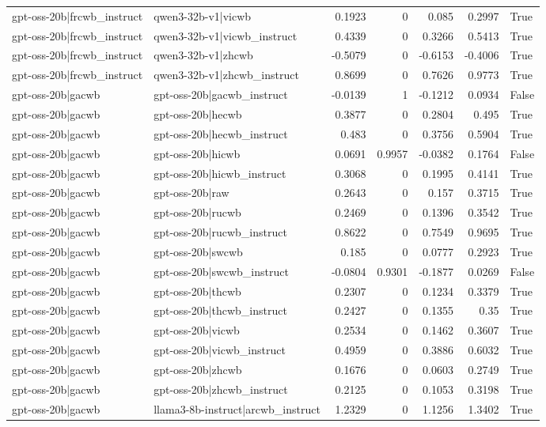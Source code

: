 \begin{table}
\begin{tabular}{l l r r r r l}
gpt-oss-20b|frcwb_instruct & qwen3-32b-v1|vicwb & 0.1923 & 0 & 0.085 & 0.2997 & True \\
gpt-oss-20b|frcwb_instruct & qwen3-32b-v1|vicwb_instruct & 0.4339 & 0 & 0.3266 & 0.5413 & True \\
gpt-oss-20b|frcwb_instruct & qwen3-32b-v1|zhcwb & -0.5079 & 0 & -0.6153 & -0.4006 & True \\
gpt-oss-20b|frcwb_instruct & qwen3-32b-v1|zhcwb_instruct & 0.8699 & 0 & 0.7626 & 0.9773 & True \\
gpt-oss-20b|gacwb & gpt-oss-20b|gacwb_instruct & -0.0139 & 1 & -0.1212 & 0.0934 & False \\
gpt-oss-20b|gacwb & gpt-oss-20b|hecwb & 0.3877 & 0 & 0.2804 & 0.495 & True \\
gpt-oss-20b|gacwb & gpt-oss-20b|hecwb_instruct & 0.483 & 0 & 0.3756 & 0.5904 & True \\
gpt-oss-20b|gacwb & gpt-oss-20b|hicwb & 0.0691 & 0.9957 & -0.0382 & 0.1764 & False \\
gpt-oss-20b|gacwb & gpt-oss-20b|hicwb_instruct & 0.3068 & 0 & 0.1995 & 0.4141 & True \\
gpt-oss-20b|gacwb & gpt-oss-20b|raw & 0.2643 & 0 & 0.157 & 0.3715 & True \\
gpt-oss-20b|gacwb & gpt-oss-20b|rucwb & 0.2469 & 0 & 0.1396 & 0.3542 & True \\
gpt-oss-20b|gacwb & gpt-oss-20b|rucwb_instruct & 0.8622 & 0 & 0.7549 & 0.9695 & True \\
gpt-oss-20b|gacwb & gpt-oss-20b|swcwb & 0.185 & 0 & 0.0777 & 0.2923 & True \\
gpt-oss-20b|gacwb & gpt-oss-20b|swcwb_instruct & -0.0804 & 0.9301 & -0.1877 & 0.0269 & False \\
gpt-oss-20b|gacwb & gpt-oss-20b|thcwb & 0.2307 & 0 & 0.1234 & 0.3379 & True \\
gpt-oss-20b|gacwb & gpt-oss-20b|thcwb_instruct & 0.2427 & 0 & 0.1355 & 0.35 & True \\
gpt-oss-20b|gacwb & gpt-oss-20b|vicwb & 0.2534 & 0 & 0.1462 & 0.3607 & True \\
gpt-oss-20b|gacwb & gpt-oss-20b|vicwb_instruct & 0.4959 & 0 & 0.3886 & 0.6032 & True \\
gpt-oss-20b|gacwb & gpt-oss-20b|zhcwb & 0.1676 & 0 & 0.0603 & 0.2749 & True \\
gpt-oss-20b|gacwb & gpt-oss-20b|zhcwb_instruct & 0.2125 & 0 & 0.1053 & 0.3198 & True \\
gpt-oss-20b|gacwb & llama3-8b-instruct|arcwb_instruct & 1.2329 & 0 & 1.1256 & 1.3402 & True \\

\end{tabular}
\end{table}
